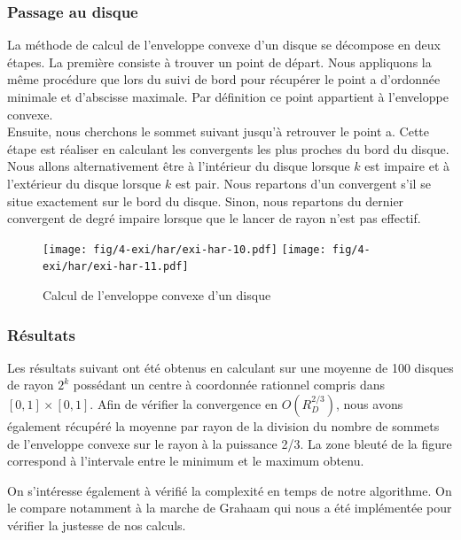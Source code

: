 
\subsubsection{Passage au disque}


La méthode de calcul de l'enveloppe convexe d'un disque se décompose en deux étapes. La première consiste à trouver un point de départ. Nous appliquons la même procédure que lors du suivi de bord pour récupérer le point a d'ordonnée minimale et d'abscisse maximale. Par définition ce point appartient à l'enveloppe convexe.\\

Ensuite, nous cherchons le sommet suivant jusqu'à retrouver le point a. Cette étape est réaliser en calculant les convergents les plus proches du bord du disque. Nous allons alternativement être à l'intérieur du disque lorsque $k$ est impaire et à l'extérieur du disque lorsque $k$ est pair. Nous repartons d'un convergent s'il se situe exactement sur le bord du disque. Sinon, nous repartons du dernier convergent de degré impaire lorsque que le lancer de rayon n'est pas effectif.\\

\begin{figure}[H]
  \centering
  \texttt{[image: fig/4-exi/har/exi-har-10.pdf]}
  \texttt{[image: fig/4-exi/har/exi-har-11.pdf]}
  \caption{Calcul de l'enveloppe convexe d'un disque}
\end{figure}

\subsubsection{Résultats}

Les résultats suivant ont été obtenus en calculant sur une moyenne de 100 disques de rayon $2^k$ possédant un centre à coordonnée rationnel compris dans $[0,1]\times[0,1]$. Afin de vérifier la convergence en $O(R_{D}^{2/3})$, nous avons également récupéré la moyenne par rayon de la division du nombre de sommets de l'enveloppe convexe sur le rayon à la puissance 2/3. La zone bleuté de la figure correspond à l'intervale entre le minimum et le maximum obtenu.

On s'intéresse également à vérifié la complexité en temps de notre algorithme. On le compare notamment à la marche de Grahaam qui nous a été implémentée pour vérifier la justesse de nos calculs. 

